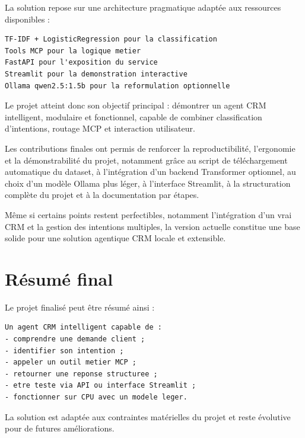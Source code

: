 \documentclass[12pt,a4paper]{report}
\begin{document}
La solution repose sur une architecture pragmatique adaptée aux ressources disponibles :

\begin{lstlisting}
TF-IDF + LogisticRegression pour la classification
Tools MCP pour la logique metier
FastAPI pour l'exposition du service
Streamlit pour la demonstration interactive
Ollama qwen2.5:1.5b pour la reformulation optionnelle
\end{lstlisting}

Le projet atteint donc son objectif principal : démontrer un agent CRM intelligent, modulaire et fonctionnel, capable de combiner classification d'intentions, routage MCP et interaction utilisateur.

Les contributions finales ont permis de renforcer la reproductibilité, l'ergonomie et la démonstrabilité du projet, notamment grâce au script de téléchargement automatique du dataset, à l'intégration d'un backend Transformer optionnel, au choix d'un modèle Ollama plus léger, à l'interface Streamlit, à la structuration complète du projet et à la documentation par étapes.

Même si certains points restent perfectibles, notamment l'intégration d'un vrai CRM et la gestion des intentions multiples, la version actuelle constitue une base solide pour une solution agentique CRM locale et extensible.

\section*{Résumé final}

Le projet finalisé peut être résumé ainsi :

\begin{lstlisting}
Un agent CRM intelligent capable de :
- comprendre une demande client ;
- identifier son intention ;
- appeler un outil metier MCP ;
- retourner une reponse structuree ;
- etre teste via API ou interface Streamlit ;
- fonctionner sur CPU avec un modele leger.
\end{lstlisting}

La solution est adaptée aux contraintes matérielles du projet et reste évolutive pour de futures améliorations.
\end{document}
